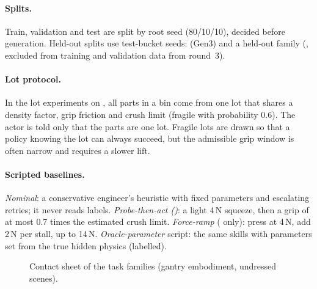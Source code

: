 \paragraph{Splits.} Train, validation and test are split by root seed (80/10/10), decided before generation.
Held-out splits use test-bucket seeds:  (Gen3) and a held-out family (,
excluded from training and validation data from round~3).

\paragraph{Lot protocol.} In the lot experiments on , all parts in a bin come from one lot
that shares a density factor, grip friction and crush limit (fragile with probability 0.6). The actor is told
only that the parts are one lot. Fragile lots are drawn so that a policy knowing the lot can always succeed,
but the admissible grip window is often narrow and requires a slower lift.

\paragraph{Scripted baselines.}
\emph{Nominal}: a conservative engineer's heuristic with fixed parameters and escalating retries; it never
reads labels. \emph{Probe-then-act (\pta)}: a light 4\,N squeeze, then a grip of at most 0.7 times the estimated
crush limit. \emph{Force-ramp} ( only): press at 4\,N, add 2\,N per stall, up to 14\,N.
\emph{Oracle-parameter} script: the same skills with parameters set from the true hidden physics (labelled).

\begin{figure}[!htbp]
  \centering
  \caption{Contact sheet of the task families (gantry embodiment, undressed scenes).}
  \label{fig:families}
\end{figure}

